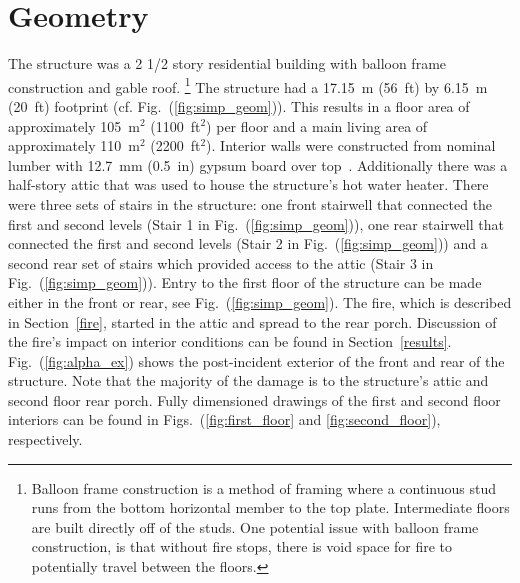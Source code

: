 \documentclass[11pt,oneside]{book}
\begin{document}
\section{Geometry}
\label{geom}
The structure was a 2 1/2 story residential building with balloon frame construction and gable roof. \footnote{Balloon frame construction is a method of framing where a continuous stud runs from the bottom horizontal member to the top plate. Intermediate floors are built directly off of the studs. One potential issue with balloon frame construction, is that without fire stops, there is void space for fire to potentially travel between the floors.} The structure had a 17.15~m (56~ft) by 6.15~m (20~ft) footprint (cf. Fig.~(\ref{fig:simp_geom})). This results in a floor area of approximately 105~m$^2$ (1100~ft$^2$) per floor and a main living area of approximately 110~m$^2$ (2200~ft$^2$). Interior walls were constructed from nominal lumber with 12.7~mm (0.5~in) gypsum board over top~\cite{NIOSH:Bowyer}. Additionally there was a half-story attic that was used to house the structure's hot water heater. There were three sets of stairs in the structure: one front stairwell that connected the first and second levels (Stair 1 in Fig.~(\ref{fig:simp_geom})), one rear stairwell that connected the first and second levels (Stair 2 in Fig.~(\ref{fig:simp_geom})) and a second rear set of stairs which provided access to the attic (Stair 3 in Fig.~(\ref{fig:simp_geom})). Entry to the first floor of the structure can be made either in the front or rear, see Fig.~(\ref{fig:simp_geom}). The fire, which is described in Section~\ref{fire}, started in the attic and spread to the rear porch. Discussion of the fire's impact on interior conditions can be found in Section~\ref{results}. Fig.~(\ref{fig:alpha_ex}) shows the post-incident exterior of the front and rear of the structure. Note that the majority of the damage is to the structure's attic and second floor rear porch. Fully dimensioned drawings of the first and second floor interiors can be found in Figs.~(\ref{fig:first_floor} and \ref{fig:second_floor}), respectively.
\end{document}
